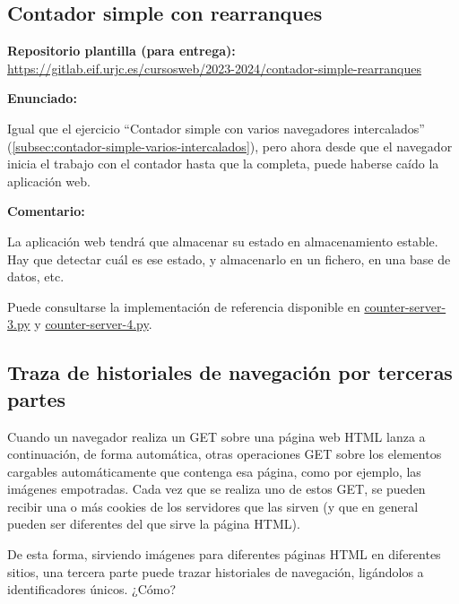 \subsection{Contador simple con rearranques}
\label{subsec:contador-simple-rearranques}

\textbf{Repositorio plantilla (para entrega):} \\
\url{https://gitlab.eif.urjc.es/cursosweb/2023-2024/contador-simple-rearranques}

\textbf{Enunciado:}

Igual que el ejercicio ``Contador simple con varios navegadores intercalados'' (\ref{subsec:contador-simple-varios-intercalados}), pero ahora desde que el navegador inicia el trabajo con el contador hasta que la completa, puede haberse caído la aplicación web.

\textbf{Comentario:}

La aplicación web tendrá que  almacenar su estado en almacenamiento estable. Hay que detectar cuál es ese estado, y almacenarlo en  un fichero, en  una base de datos, etc.

Puede consultarse la implementación de referencia disponible en
\href{https://github.com/CursosWeb/Code/blob/master/Python-Web/counter/counter-server-3.py}{counter-server-3.py} y
\href{https://github.com/CursosWeb/Code/blob/master/Python-Web/counter/counter-server-4.py}{counter-server-4.py}.


\subsection{Traza de historiales de navegación por terceras partes}
\label{subsec:navegacion-terceras-partes}

Cuando un navegador realiza un GET sobre una página web HTML lanza a continuación, de forma automática, otras operaciones GET sobre los elementos cargables automáticamente que contenga esa página, como por ejemplo, las imágenes empotradas. Cada vez que se realiza uno de estos GET, se pueden recibir una o más cookies de los servidores que las sirven (y que en general pueden ser diferentes del que sirve la página HTML).

De esta forma, sirviendo imágenes para diferentes páginas HTML en diferentes sitios, una tercera parte puede trazar historiales de navegación, ligándolos a identificadores únicos. ¿Cómo?

